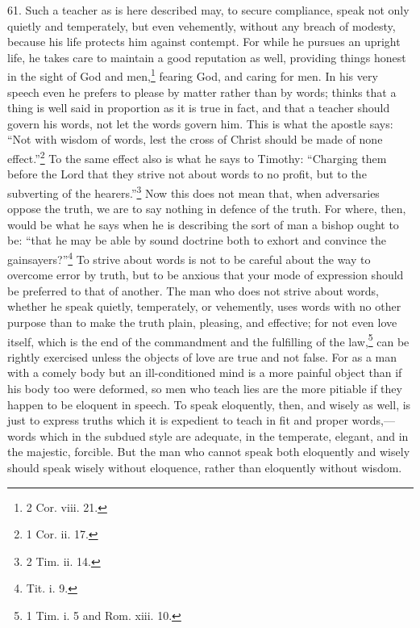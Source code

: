 61. Such a teacher as is here described may, to secure compliance, speak not only quietly and temperately, but even vehemently, without any breach of modesty, because his life protects him against contempt. For while he pursues an upright life, he takes care to maintain a good reputation as well, providing things honest in the sight of God and men,\footnote{2 Cor. viii. 21.} fearing God, and caring for men. In his very speech even he prefers to please by matter rather than by words; thinks that a thing is well said in proportion as it is true in fact, and that a teacher should govern his words, not let the words govern him. This is what the apostle says: “Not with wisdom of words, lest the cross of Christ should be made of none effect.”\footnote{1 Cor. ii. 17.} To the same effect also is what he says to Timothy: “Charging them before the Lord that they strive not about words to no profit, but to the subverting of the hearers.”\footnote{2 Tim. ii. 14.} Now this does not mean that, when adversaries oppose the truth, we are to say nothing in defence of the truth. For where, then, would be what he says when he is describing the sort of man a bishop ought to be: “that he may be able by sound doctrine both to exhort and convince the gainsayers?”\footnote{Tit. i. 9.} To strive about words is not to be careful about the way to overcome error by truth, but to be anxious that your mode of expression should be preferred to that of another. The man who does not strive about words, whether he speak quietly, temperately, or vehemently, uses words with no other purpose than to make the truth plain, pleasing, and effective; for not even love itself, which is the end of the commandment and the fulfilling of the law,\footnote{1 Tim. i. 5 and Rom. xiii. 10.} can be rightly exercised unless the objects of love are true and not false. For as a man with a comely body but an ill-conditioned mind is a more painful object than if his body too were deformed, so men who teach lies are the more pitiable if they happen to be eloquent in speech. To speak eloquently, then, and wisely as well, is just to express truths which it is expedient to teach in fit and proper words,—words which in the subdued style are adequate, in the temperate, elegant, and in the majestic, forcible. But the man who cannot speak both eloquently and wisely should speak wisely without eloquence, rather than eloquently without wisdom.


